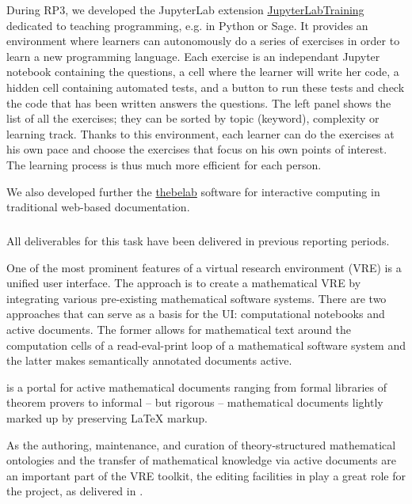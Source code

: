 
During RP3, we developed the JupyterLab extension
\href{https://gitlab.com/logilab/jupyterhub-training}{JupyterLabTraining}
dedicated to teaching programming, e.g. in Python or Sage.
It provides an environment where learners can autonomously do a
series of exercises in order to learn a new programming language. Each exercise is
an independant Jupyter notebook containing the questions, a cell where the learner will
write her code, a hidden cell containing automated tests, and a button to run these tests
and check the code that has been written answers the questions. The left panel shows
the list of all the exercises; they can be sorted by topic (keyword), complexity or
learning track. Thanks to this environment, each learner can do the exercises at his
own pace and choose the exercises that focus on his own points of interest. The
learning process is thus much more efficient for each person.

We also developed further the
\href{https://github.com/minrk/thebelab}{thebelab} software for
interactive computing in traditional web-based documentation.

\subparagraph{}
\label{UI@mathhub}

All deliverables for this task have been delivered in previous reporting periods.

One of the most prominent features of a virtual research environment (VRE) is a unified user interface. The \ODK approach is to create a mathematical VRE by integrating various pre-existing mathematical software systems. There are two approaches that can serve as a basis for the \ODK UI: computational notebooks and active documents. The former allows for mathematical text around the computation cells of a read-eval-print loop of a mathematical software system and the latter makes semantically annotated documents active.

\MathHub is a portal for active mathematical documents ranging from formal libraries of theorem provers to informal – but rigorous – mathematical documents lightly marked up by preserving LaTeX markup.

As the authoring, maintenance, and curation of theory-structured mathematical ontologies and the transfer of mathematical knowledge via active documents are an important part of the \ODK VRE toolkit, the editing facilities in \MathHub play a great role for the project,
as delivered in .

